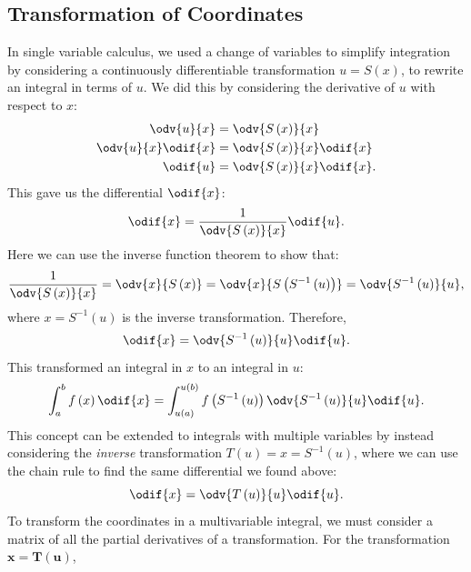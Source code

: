 \documentclass{article}
\begin{document}
\subsection{Transformation of Coordinates}
In single variable calculus, we used a change of variables to simplify
integration by considering a continuously differentiable transformation
\(u = S\left( x \right)\), to rewrite an integral in terms of \(u\). We
did this by considering the derivative of \(u\) with respect to \(x\):
\begin{align*}
    \odv{u}{x}          & = \odv{S\left( x \right)}{x}           \\
    \odv{u}{x} \odif{x} & = \odv{S\left( x \right)}{x} \odif{x}  \\
    \odif{u}            & = \odv{S\left( x \right)}{x} \odif{x}.
\end{align*}
This gave us the differential \(\odif{x}\):
\begin{equation*}
    \odif{x} = \frac{1}{\odv{S\left( x \right)}{x}} \odif{u}.
\end{equation*}
Here we can use the inverse function theorem to show that:
\begin{align*}
    \frac{1}{\odv{S\left( x \right)}{x}} = \odv{x}{S\left( x \right)} = \odv{x}{S\left( S^{-1}\left( u \right) \right)} = \odv{S^{-1}\left( u \right)}{u},
\end{align*}
where \(x = S^{-1}\left( u \right)\) is the inverse transformation.
Therefore,
\begin{equation*}
    \odif{x} = \odv{S^{-1}\left( u \right)}{u} \odif{u}.
\end{equation*}
This transformed an integral in \(x\) to an integral in \(u\):
\begin{equation*}
    \int_a^b f\left( x \right) \odif{x} = \int_{u\left( a \right)}^{u\left( b \right)} f\left( S^{-1}\left( u \right) \right) \odv{S^{-1}\left( u \right)}{u} \odif{u}.
\end{equation*}
This concept can be extended to integrals with multiple variables by
instead considering the \textit{inverse} transformation
\(T\left( u \right) = x = S^{-1}\left( u \right)\), where we can use
the chain rule to find the same differential we found above:
\begin{equation*}
    \odif{x} = \odv{T\left( u \right)}{u} \odif{u}.
\end{equation*}
To transform the coordinates in a multivariable integral, we must consider
a matrix of all the partial derivatives of a transformation. For the
transformation \(\symbf{x} = \symbf{T}\left( \symbf{u} \right)\),
\end{document}
